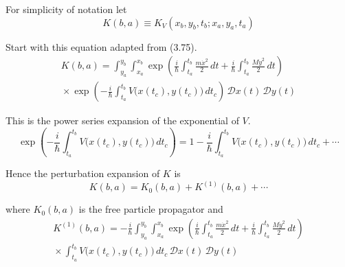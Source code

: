 


\bigskip
For simplicity of notation let
\begin{equation*}
K(b,a)\equiv K_V(x_b,y_b,t_b;x_a,y_a,t_a)
\end{equation*}

Start with this equation adapted from (3.75).
\begin{multline*}
K(b,a)=\int_{y_a}^{y_b}\int_{x_a}^{x_b}
\exp\left(\frac{i}{\hbar}\int_{t_a}^{t_b}\frac{m\dot x^2}{2}\,dt
+\frac{i}{\hbar}\int_{t_a}^{t_b}\frac{M\dot y^2}{2}\,dt\right)
\\
{}\times\exp\left(-\frac{i}{\hbar}\int_{t_a}^{t_b}V\bigl(x(t_c),y(t_c)\bigr)\,dt_c\right)
\,\mathscr Dx(t)\,\mathscr Dy(t)
\end{multline*}

This is the power series expansion of the exponential of $V$.
\begin{equation*}
\exp\left(-\frac{i}{\hbar}\int_{t_a}^{t_b}V\bigl(x(t_c),y(t_c)\bigr)\,dt_c\right)
=1-\frac{i}{\hbar}\int_{t_a}^{t_b}V\bigl(x(t_c),y(t_c)\bigr)\,dt_c+{}\cdots
\end{equation*}

Hence the perturbation expansion of $K$ is
\begin{equation*}
K(b,a)=K_0(b,a)+K^{(1)}(b,a)+{}\cdots
\end{equation*}

where $K_0(b,a)$ is the free particle propagator and
\begin{multline*}
K^{(1)}(b,a)=-\frac{i}{\hbar}\int_{y_a}^{y_b}\int_{x_a}^{x_b}
\exp\left(\frac{i}{\hbar}\int_{t_a}^{t_b}\frac{m\dot x^2}{2}\,dt
+\frac{i}{\hbar}\int_{t_a}^{t_b}\frac{M\dot y^2}{2}\,dt\right)
\\
{}\times\int_{t_a}^{t_b}V\bigl(x(t_c),y(t_c)\bigr)
\,dt_c\,\mathscr Dx(t)\,\mathscr Dy(t)
\end{multline*}

